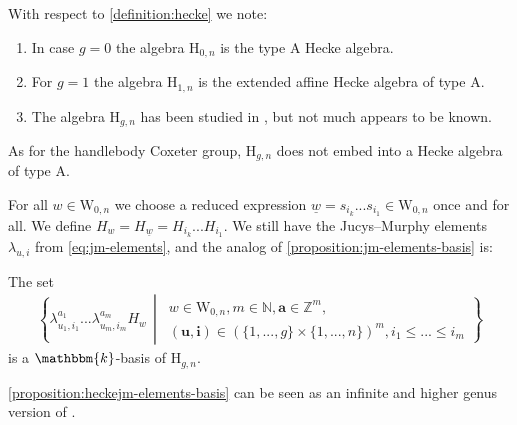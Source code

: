 \documentclass[a4paper,11pt]{amsart}
\renewcommand{\dots}{\text{...}}
\newcommand{\setstuff}[1]{\mathrm{#1}}
\newcommand{\Z}{\mathbb{Z}}
\newcommand{\KK}{\mathbbm{k}}
\newcommand{\N}{\mathbb{N}}
\newcommand{\bsym}[1]{\boldsymbol{#1}}
\numberwithin{equation}{section}
\let\fullref\autoref
\begin{document}
\begin{remark}\label{remark:hecke}
With respect to \fullref{definition:hecke} we note:	
\begin{enumerate}

\item In case $g=0$ the algebra $\setstuff{H}_{0,n}$ is the type A Hecke algebra.

\item For $g=1$ the algebra $\setstuff{H}_{1,n}$ is the extended affine Hecke algebra of type A. 

\item The algebra $\setstuff{H}_{g,n}$  
has been studied in \cite{Ba-braid-handlebodies}, 
but not much appears to be known.
\end{enumerate}
As for the handlebody Coxeter group, 
$\setstuff{H}_{g,n}$ does not embed into 
a Hecke algebra of type A. 
\end{remark}

For all $w\in\setstuff{W}_{0,n}$ we choose a 
reduced expression $\underline{w}=s_{i_{k}}\dots 
s_{i_{1}}\in\setstuff{W}_{0,n}$ 
once and for all. We define $H_{w}=H_{\underline{w}}=H_{i_{k}}\dots H_{i_{1}}$. 
We still have the Jucys--Murphy elements $\lambda_{u,i}$ 
from \eqref{eq:jm-elements}, and the analog of \fullref{proposition:jm-elements-basis} is:

\begin{proposition}\label{proposition:heckejm-elements-basis}
The set
\begin{gather}\label{eq:jm-basis-hecke1}
\left\{ 
\lambda_{u_{1},i_{1}}^{a_{1}}\dots 
\lambda_{u_{m},i_{m}}^{a_{m}}H_{w} 
\,\middle\vert\,
\begin{gathered}
w\in\setstuff{W}_{0,n},
m\in\N,
\bsym{a}\in\Z^{m},
\\
(\bsym{u},\bsym{i})\in(\{1,\dots,g\}\times\{1,\dots,n\})^{m},
i_{1}\leq\dots\leq i_{m}
\end{gathered}
\right\}
\end{gather}
is a $\KK$-basis of $\setstuff{H}_{g,n}$.
\end{proposition}

\fullref{proposition:heckejm-elements-basis} can be seen 
as an infinite and higher genus version of
\cite[Equation (3.10)]{ArKo-hecke-algebra}.
\end{document}
